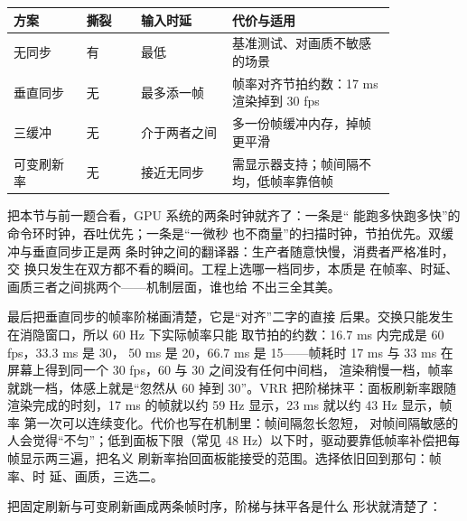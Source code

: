 \begin{longtable}{L{0.16\linewidth}L{0.12\linewidth}L{0.2\linewidth}L{0.36\linewidth}}
\toprule
方案 & 撕裂 & 输入时延 & 代价与适用 \\
\midrule
无同步 & 有 & 最低 & 基准测试、对画质不敏感的场景 \\\tablerowrule
垂直同步 & 无 & 最多添一帧 & 帧率对齐节拍约数：17 ms 渲染掉到 30 fps \\\tablerowrule
三缓冲 & 无 & 介于两者之间 & 多一份帧缓冲内存，掉帧更平滑 \\\tablerowrule
可变刷新率 & 无 & 接近无同步 & 需显示器支持；帧间隔不均，低帧率靠倍帧 \\
\bottomrule
\end{longtable}

把本节与前一题合看，GPU 系统的两条时钟就齐了：一条是“
能跑多快跑多快”的命令环时钟，吞吐优先；一条是“一微秒
也不商量”的扫描时钟，节拍优先。双缓冲与垂直同步正是两
条时钟之间的翻译器：生产者随意快慢，消费者严格准时，交
换只发生在双方都不看的瞬间。工程上选哪一档同步，本质是
在帧率、时延、画质三者之间挑两个——机制层面，谁也给
不出三全其美。

最后把垂直同步的帧率阶梯画清楚，它是“对齐”二字的直接
后果。交换只能发生在消隐窗口，所以 60 Hz 下实际帧率只能
取节拍的约数：16.7 ms 内完成是 60 fps，33.3 ms 是 30，
50 ms 是 20，66.7 ms 是 15——帧耗时 17 ms 与 33 ms 在
屏幕上得到同一个 30 fps，60 与 30 之间没有任何中间档，
渲染稍慢一档，帧率就跳一档，体感上就是“忽然从 60 掉到
30”。VRR 把阶梯抹平：面板刷新率跟随渲染完成的时刻，17
ms 的帧就以约 59 Hz 显示，23 ms 就以约 43 Hz 显示，帧率
第一次可以连续变化。代价也写在机制里：帧间隔忽长忽短，
对帧间隔敏感的人会觉得“不匀”；低到面板下限（常见 48
Hz）以下时，驱动要靠低帧率补偿把每帧显示两三遍，把名义
刷新率抬回面板能接受的范围。选择依旧回到那句：帧率、时
延、画质，三选二。

把固定刷新与可变刷新画成两条帧时序，阶梯与抹平各是什么
形状就清楚了：


